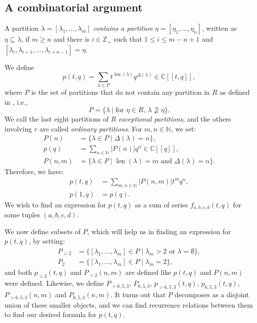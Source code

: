 \documentclass[a4paper, 12pt, reqno]{amsart}
\theoremstyle{remark}
\DeclareMathOperator{\len}{len}
\begin{document}
\subsection{A combinatorial argument}
\label{sec:comb-argum}

A partition $\lambda = [\lambda_1, \dots, \lambda_m]$ \emph{contains a partition} $\eta = [\eta_1, \dots, \eta_n]$, written as $\eta \subseteq \lambda$, if $m \ge n$ and there is $i \in \mathbb{Z}_+$ such that $1 \le i \le m - n + 1$ and $[\lambda_i, \lambda_{i + 1}, \dots, \lambda_{i + n - 1}] = \eta$.

We define
\begin{equation*}
  p(t, q) = \sum_{\lambda \in P}t^{\len(\lambda)}q^{\Delta(\lambda)} \in \mathbb{C}[[t, q]],
\end{equation*}
where $P$ is the set of partitions that do not contain any partition in $R$ as defined in , i.e.,
\begin{equation*}
  P = \{\lambda \mid \text{for $\eta \in R$, $\lambda \nsupseteq \eta$}\}.
\end{equation*}
We call the last eight partitions of $R$ \emph{exceptional partitions}, and the others involving $r$ are called \emph{ordinary partitions}.
For $m, n \in \mathbb{N}$, we set:
\begin{align*}
  P(n) &= \{\lambda \in P \mid \Delta(\lambda) = n\}, \\
  p(q) &= \sum_{n \in \mathbb{N}}|P(n)|q^n \in \mathbb{C}[[q]], \\
  P(n, m) &= \{\lambda \in P \mid \text{$\len(\lambda) = m$ and $\Delta(\lambda) = n$}\}.
\end{align*}
Therefore, we have:
\begin{align*}
  p(t, q) &= \sum_{m, n \in \mathbb{N}}|P(n, m)|t^mq^n, \\
  p(1, q) &= p(q).
\end{align*}
We wish to find an expression for $p(t, q)$ as a sum of series $f_{a, b, c, d}(t, q)$ for some tuples $(a, b, c, d)$.

We now define subsets of $P$, which will help us in finding an expression for $p(t, q)$, by setting:
\begin{align*}
  P_{>2} &= \{[\lambda_1, \dots, \lambda_m] \in P \mid \text{$\lambda_m > 2$ or $\lambda = \emptyset$}\}, \\
  P_2 &= \{[\lambda_1, \dots, \lambda_m] \in P \mid \lambda_m = 2\},
\end{align*}
and both $p_{>2}(t, q)$ and $P_{>2}(n, m)$ are defined like $p(t, q)$ and $P(n, m)$ were defined.
Likewise, we define $P_{>6, 5, 3}$, $P_{6, 5, 3}$, $p_{>6, 5, 3}(t, q)$, $p_{6, 5, 3}(t, q)$, $P_{>6, 5, 3}(n, m)$ and $P_{6, 5, 3}(n, m)$.
It turns out that $P$ decomposes as a disjoint union of these smaller objects, and we can find recurrence relations between them to find our desired formula for $p(t, q)$.
\end{document}
